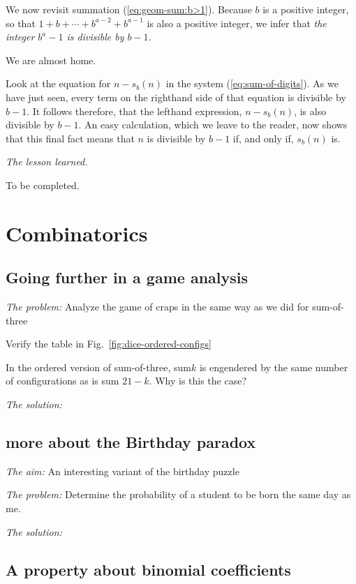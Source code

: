 We now revisit summation (\ref{eq:geom-sum:b>1}).  Because $b$ is a
positive integer, so that $1 + b + \cdots + b^{a-2} + b^{a-1}$ is also
a positive integer, we infer that {\em the integer $b^a -1$ is
  divisible by $b-1$.}

We are almost home.  

Look at the equation for $n - s_b(n)$ in the
system (\ref{eq:sum-of-digits}).  As we have just seen, every term on
the righthand side of that equation is divisible by $b-1$.  It follows
therefore, that the lefthand expression, $n - s_b(n)$, is also
divisible by $b-1$.
An easy calculation, which we leave to the reader, now shows that this
final fact means that $n$ is divisible by $b-1$ if, and only if, $s_b(n)$ is.
\medskip

\noindent \textit{The lesson learned.}

To be completed.



\section{Combinatorics}

\subsection{Going further in a game analysis}

\noindent \textit{The problem:}
Analyze the game of craps in the same way as we did for sum-of-three

Verify the table in Fig.~\ref{fig:dice-ordered-configs}

In the ordered version of sum-of-three, sum$k$ is engendered by the
same number of configurations as is sum $21 - k$.  
Why is this the case?

\noindent \textit{The solution:}

\subsection{more about the Birthday paradox}

\noindent \textit{The aim:}
An interesting variant of the birthday puzzle
\medskip

\noindent \textit{The problem:}
Determine the
probability of a student to be born the same day as me.
\medskip

\noindent \textit{The solution:}


\subsection{A property about binomial coefficients}

